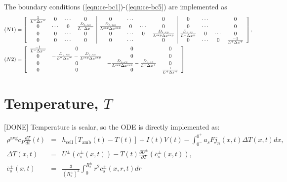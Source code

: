 \documentclass[12pt]{article}
\begin{document}
The boundary conditions (\ref{eqn:ce-bc1})-(\ref{eqn:ce-bc5}) are implemented as
\begin{align}
(N1) &=
\left[
\begin{array}{cccc | cccc | cccc}
  \frac{1}{L^{-} \Delta x^{-}} & 0 & \cdots & 0 & 0 & \cdots & & 0 & 0 & \cdots & & 0\\
  0 & \cdots & 0 & \frac{D_{e,ns}}{L^{-}\Delta x^{-}} & \frac{D_{e,ns}}{L^{sep}\Delta x^{sep}} & 0 & \cdots & 0 & 0 & \cdots & & 0\\
  0 & 0 & \cdots & 0 & 0 & \cdots & 0 & \frac{D_{e,sp}}{L^{sep}\Delta x^{sep}} & \frac{D_{e,sp}}{L^{+}\Delta x^{+}} & 0 & \cdots & 0\\
  0 & 0 & \cdots & 0 & 0 & \cdots & & 0 & 0 & \cdots & 0 & \frac{-1}{L^{+} \Delta x^{+}}
\end{array}
\right], \\
(N2) &= 
\left[
\begin{array}{cccc}
  \frac{-1}{L^{-} \Delta x^{-}} & 0  & 0 & 0 \\
  0 & -\frac{D_{e,ns}}{L^{-} \Delta x^{-}} - \frac{D_{e,ns}}{L^{sep} \Delta x^{sep}}  & 0  & 0 \\
  0 & 0  & -\frac{D_{e,sp}}{L^{sep} \Delta x^{sep}} - \frac{D_{e,sp}}{L^{+} \Delta x^{+}} & 0 \\
  0 & 0  & 0  & \frac{1}{L^{+} \Delta x^{+}}
\end{array}
\right]
\end{align}


\section{Temperature, $T$}\label{sec:T}
[DONE] Temperature is scalar, so the ODE is directly implemented as:
\begin{eqnarray}
\rho^{\textrm{avg}} c_{P} \frac{dT}{dt}(t) &=& h_{\textrm{cell}} \left[ T_{\textrm{amb}}(t) - T(t) \right] + I(t) V(t) -\int_{0^{-}}^{0^{+}} a_{s} F j_{n}(x,t) \Delta T(x,t) dx, \\
\Delta T(x,t) &=& U^{\pm}(\overline{c}^{\pm}_{s}(x,t)) - T(t) \frac{\partial U^{\pm}}{\partial T}(\overline{c}^{\pm}_{s}(x,t)), \\
\overline{c}_{s}^{\pm}(x,t) &=& \frac{3}{(R_{s}^{\pm})^{3}} \int_{0}^{R_{s}^{\pm}} r^{2} c_{s}^{\pm}(x,r,t) dr 
\end{eqnarray}

\end{document}

